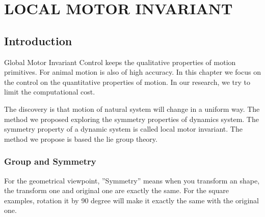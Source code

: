 \chapter{LOCAL MOTOR INVARIANT}
\label{chap:li}

\ifpdf
    \graphicspath{{LocalInvariant/LocalInvariantFigs/PNG/}{LocalInvariant/LocalInvariantFigs/PDF/}{LocalInvariant/LocalInvariantFigs/}}
\else
    \graphicspath{{LocalInvariant/LocalInvariantFigs/EPS/}{LocalInvariant/LocalInvariantFigs/}}
\fi

\section{Introduction}
Global Motor Invariant Control keeps the qualitative properties of motion primitives.
For animal motion is also of high accuracy.
In this chapter we focus on the control on the quantitative properties of motion.
In our research, we try to limit the computational cost.


The discovery is that motion of natural system will change in a uniform way.
The method we proposed exploring the symmetry properties of dynamics system.
The symmetry property of a dynamic system is called local motor invariant.
The method we propose is based the lie group theory.

\subsection{Group and Symmetry}
For the geometrical viewpoint, ''Symmetry''  means when you transform an shape, the transform one and original one are exactly the same.
For the square examples, rotation it by 90 degree will make it exactly the same with the original one.



